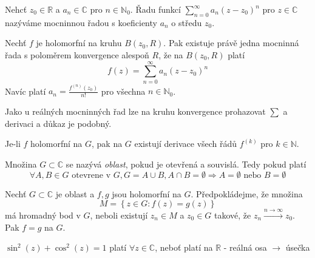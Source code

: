 \begin{definice}
Nehcť $z_0 \in \mathbb{R}$ a $a_n \in \mathbb{C}$ pro $n \in \mathbb{N}_0$. Řadu funkcí $\sum_{n=0}^{\infty} a_n (z-z_0)^n$ pro $z \in \mathbb{C}$ nazýváme mocninnou řadou s koeficienty $a_n$ o středu $z_0$.
\end{definice}

\begin{vetat}
\label{o rozvoji do Taylorovy řady}
Nechť $f$ je holomorfní na kruhu $B(z_0, R)$. Pak existuje právě jedna mocninná řada s poloměrem konvergence alespoň $R$, že na $B(z_0, R)$ platí
$$f(z) = \sum_{n=0}^\infty a_n (z-z_0)^n$$
Navíc platí $a_n = \frac{f^{(n)}(z_0)}{n!}$ pro všechna $n \in \mathbb{N}_0$.
\end{vetat}

Jako u reálných mocninných řad lze na kruhu konvergence prohazovat $\sum$ a derivaci a důkaz je podobný.

\begin{dusledek}
Je-li $f$ holomorfní na $G$, pak na $G$ existují derivace všech řádů $f^{(k)}$ pro $k \in \mathbb{N}$.
\end{dusledek}

\begin{definice}
Množina $G \subset \mathbb{C}$ se nazývá \emph{oblast}, pokud je otevřená a souvislá. Tedy pokud platí
$$\forall A, B \in G \textrm{ otevrene v } G, G=A \cup B, A \cap B = \emptyset \Rightarrow A = \emptyset \textrm{ nebo } B = \emptyset$$
\end{definice}

\begin{vetal}
Nechť $G \subset \mathbb{C}$ je oblast a $f, g$ jsou holomorfní na $G$. Předpokládejme, že množina
$$M = \left\{ z \in G : f(z)=g(z) \right\} $$
má hromadný bod v $G$, neboli existují $z_n \in M$ a $z_0 \in G$ takové, že $z_n \stackrel{n \rightarrow \infty}{\rightarrow} z_0$. Pak $f=g$ na $G$.
\end{vetal}

\begin{dusledek}
$\sin^2 (z) + \cos^2 (z) = 1$ platí $\forall z \in \mathbb{C}$, neboť platí na $\mathbb{R}$ - reálná osa $\to$ úsečka
\end{dusledek}

